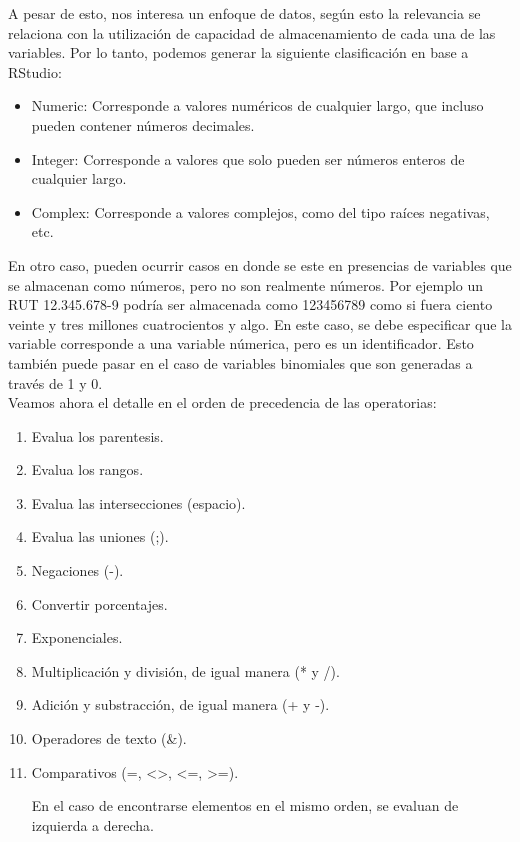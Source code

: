 \documentclass[12 pt,letterpaper]{article}
\begin{document}
A pesar de esto, nos interesa un enfoque de datos, según esto la relevancia se relaciona con la utilización de capacidad de almacenamiento de cada una de las variables. Por lo tanto, podemos generar la siguiente clasificación en base a RStudio: 

\begin{itemize}
	\item Numeric: Corresponde a valores numéricos de cualquier largo, que incluso pueden contener números decimales. 
	\item Integer: Corresponde a valores que solo pueden ser números enteros de cualquier largo. 
	\item Complex: Corresponde a valores complejos, como del tipo raíces negativas, etc. 
\end{itemize}

En otro caso, pueden ocurrir casos en donde se este en presencias de variables que se almacenan como números, pero no son realmente números. Por ejemplo un RUT 12.345.678-9 podría ser almacenada como 123456789 como si fuera ciento veinte y tres millones cuatrocientos y algo. En este caso, se debe especificar que la variable corresponde a una variable númerica, pero es un identificador. Esto también puede pasar en el caso de variables binomiales que son generadas a través de 1 y 0. \\

Veamos ahora el detalle en el orden de precedencia de las operatorias:

\begin{enumerate}
	\item Evalua los parentesis.
	\item Evalua los rangos.
	\item Evalua las intersecciones (espacio).
	\item Evalua las uniones (;).
	\item Negaciones (-).
	\item Convertir porcentajes.
	\item Exponenciales.
	\item Multiplicación y división, de igual manera (* y /).
	\item Adición y substracción, de igual manera (+ y -).
	\item Operadores de texto (\&).
	\item Comparativos (=, <>, <=, >=).
	
	En el caso de encontrarse elementos en el mismo orden, se evaluan de izquierda a derecha. 
\end{enumerate}
\end{document}
